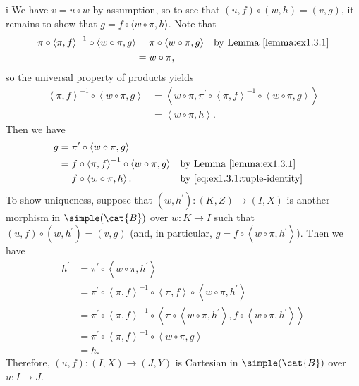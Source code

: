 \begin{partsolution}{i}
We have \(v = u \circ w\) by assumption, so to see that \((u, f) \circ (w, h) = (v, g)\), it remains to show that \(g = f \circ \langle w\circ\pi, h\rangle\).
Note that
\begin{align*}
\pi \circ \left\langle \pi, f\right\rangle^{-1} \circ \left\langle w \circ \pi, g\right\rangle
&= \pi \circ \left\langle w \circ \pi, g\right\rangle & &\text{by Lemma~\ref{lemma:ex1.3.1}} \\
&= w \circ \pi,
\end{align*}
so the universal property of products yields
\begin{equation}
\label{eq:ex1.3.1:tuple-identity}
\begin{aligned}
\left\langle \pi, f\right\rangle^{-1} \circ \left\langle w \circ \pi, g\right\rangle
&= \left\langle w \circ \pi, \pi^\prime \circ \left\langle\pi, f\right\rangle^{-1} \circ \left\langle w \circ \pi, g\right\rangle\right\rangle \\
&= \left\langle w \circ \pi, h\right\rangle.
\end{aligned}
\end{equation}
Then we have
\begin{align*}
g
&= \pi^\prime \circ \left\langle w \circ \pi, g\right\rangle \\
&= f \circ \left\langle \pi, f\right\rangle^{-1} \circ \left\langle w \circ \pi, g\right\rangle & &\text{by Lemma~\ref{lemma:ex1.3.1}} \\
&= f \circ \left\langle w \circ \pi, h\right\rangle. & &\text{by~\eqref{eq:ex1.3.1:tuple-identity}}
\end{align*}
To show uniqueness, suppose that \((w, h^\prime) : (K, Z) \to (I, X)\) is another morphism in \(\simple(\cat{B})\) over \(w: K \to I\) such that \((u, f) \circ (w, h^\prime) = (v, g)\) (and, in particular, \(g = f \circ \left\langle w \circ \pi, h^\prime\right\rangle\)).
Then we have
\begin{align*}
h^\prime
&= \pi^\prime \circ \left\langle w \circ \pi, h^\prime\right\rangle \\
&= \pi^\prime \circ \left\langle \pi, f\right\rangle^{-1} \circ \left\langle \pi, f\right\rangle \circ \left\langle w \circ \pi, h^\prime\right\rangle \\
&= \pi^\prime \circ \left\langle \pi, f\right\rangle^{-1} \circ \left\langle \pi \circ \left\langle w \circ \pi, h^\prime\right\rangle, f \circ \left\langle w \circ \pi, h^\prime\right\rangle\right\rangle \\
&= \pi^\prime \circ \left\langle \pi, f\right\rangle^{-1} \circ \left\langle  w \circ \pi, g\right\rangle \\
&= h.
\end{align*}
Therefore, \((u, f) : (I, X) \to (J, Y)\) is Cartesian in \(\simple(\cat{B})\) over \(u : I \to J\).
\end{partsolution}
